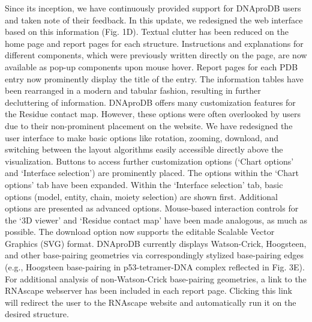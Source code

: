 Since its inception, we have continuously provided support for DNAproDB users and taken note of their feedback. In this update, we redesigned the web interface based on this information (Fig. 1D). Textual clutter has been reduced on the home page and report pages for each structure. Instructions and explanations for different components, which were previously written directly on the page, are now available as pop-up components upon mouse hover. Report pages for each PDB entry now prominently display the title of the entry. The information tables have been rearranged in a modern and tabular fashion, resulting in further decluttering of information. 
DNAproDB offers many customization features for the Residue contact map. However, these options were often overlooked by users due to their non-prominent placement on the website. We have redesigned the user interface to make basic options like rotation, zooming, download, and switching between the layout algorithms easily accessible directly above the visualization. Buttons to access further customization options (‘Chart options’ and ‘Interface selection’) are prominently placed. The options within the ‘Chart options’ tab have been expanded. Within the ‘Interface selection’ tab, basic options (model, entity, chain, moiety selection) are shown first. Additional options are presented as advanced options. Mouse-based interaction controls for the ‘3D viewer’ and ‘Residue contact map’ have been made analogous, as much as possible.
The download option now supports the editable Scalable Vector Graphics (SVG) format. DNAproDB currently displays Watson-Crick, Hoogsteen, and other base-pairing geometries via correspondingly stylized base-pairing edges (e.g., Hoogsteen base-pairing in p53-tetramer-DNA complex \citep{Kitayner2010} reflected in Fig. 3E). For additional analysis of non-Watson-Crick base-pairing geometries, a link to the RNAscape \citep{Mitra2024rnascape} webserver has been included in each report page. Clicking this link will redirect the user to the RNAscape website and automatically run it on the desired structure.

